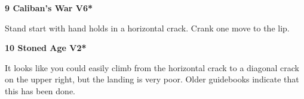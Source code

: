 \begin{multicols}{2}
\needspace{1.5cm}
\label{rt:Caliban's War}
\colorbox{RoyalBlue!20}{
\parbox{0.95\linewidth}{
\textbf{
9 Caliban's War V6*  
}}}

\begin{adjustwidth}{0.5cm}{}			
Stand start with hand holds in a horizontal crack. Crank one move to the lip.
\end{adjustwidth}



\needspace{1.5cm}
\label{rt:Stoned Age}
\colorbox{green!20}{
\parbox{0.95\linewidth}{
\textbf{
10 Stoned Age V2*  
}}}

\begin{adjustwidth}{0.5cm}{}			
It looks like you could easily climb from the horizontal crack to a diagonal crack on the upper right, but the landing is very poor. Older guidebooks indicate that this has been done.
\end{adjustwidth}





\end{multicols}
\clearpage